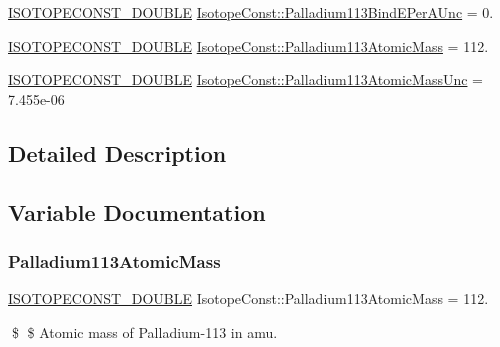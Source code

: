 \begin{DoxyCompactItemize}
\mbox{\hyperlink{group___isotope_const-_macros_ga8f45a7272ce02c0b4c65c44636ed719a}{I\+S\+O\+T\+O\+P\+E\+C\+O\+N\+S\+T\+\_\+\+D\+O\+U\+B\+LE}} \mbox{\hyperlink{group___isotope_const-_palladium-_pd113_gab1a880e94f8cdb0ad753f99f4b9631b3}{Isotope\+Const\+::\+Palladium113\+Bind\+E\+Per\+A\+Unc}} = 0.
\item 
\mbox{\hyperlink{group___isotope_const-_macros_ga8f45a7272ce02c0b4c65c44636ed719a}{I\+S\+O\+T\+O\+P\+E\+C\+O\+N\+S\+T\+\_\+\+D\+O\+U\+B\+LE}} \mbox{\hyperlink{group___isotope_const-_palladium-_pd113_ga4cef3d329c509f22649a2a72e190344a}{Isotope\+Const\+::\+Palladium113\+Atomic\+Mass}} = 112.
\item 
\mbox{\hyperlink{group___isotope_const-_macros_ga8f45a7272ce02c0b4c65c44636ed719a}{I\+S\+O\+T\+O\+P\+E\+C\+O\+N\+S\+T\+\_\+\+D\+O\+U\+B\+LE}} \mbox{\hyperlink{group___isotope_const-_palladium-_pd113_gaa0efacc8f0d3356eb2eae92a802de84e}{Isotope\+Const\+::\+Palladium113\+Atomic\+Mass\+Unc}} = 7.\+455e-\/06
\end{DoxyCompactItemize}


\subsection{Detailed Description}


\subsection{Variable Documentation}
\mbox{\label{group___isotope_const-_palladium-_pd113_ga4cef3d329c509f22649a2a72e190344a}} 
\subsubsection{\texorpdfstring{Palladium113\+Atomic\+Mass}{Palladium113AtomicMass}}
{\footnotesize\ttfamily \mbox{\hyperlink{group___isotope_const-_macros_ga8f45a7272ce02c0b4c65c44636ed719a}{I\+S\+O\+T\+O\+P\+E\+C\+O\+N\+S\+T\+\_\+\+D\+O\+U\+B\+LE}} Isotope\+Const\+::\+Palladium113\+Atomic\+Mass = 112.}

\$ \$ Atomic mass of Palladium-\/113 in amu. \mbox{\label{group___isotope_const-_palladium-_pd113_gaa0efacc8f0d3356eb2eae92a802de84e}} 
